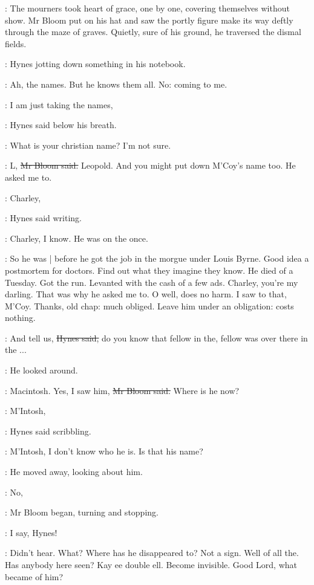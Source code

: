 :
The mourners took heart of grace,
one by one, covering themselves without show.
Mr Bloom put on his hat
and saw the portly figure make its way deftly through the maze of graves.
Quietly, sure of his ground,
he traversed the dismal fields.

\BloomInt:
Hynes jotting down something in his notebook.

\BloomInt:
Ah, the names.
But he knows them all.
No:
coming to me.

\hynes:
I am just taking the names,

:
Hynes said below his breath.

\hynes:
What is your christian name?
I'm not sure.

\Bloom:
L,
\sout{Mr Bloom said.}
Leopold.
And you might put down M'Coy's name too.
He asked me to.

\hynes:
Charley,

:
Hynes said writing.

\hynes:
Charley,
I know.
He was on the  once.

\BloomInt:
So he was |
before he got the job in the morgue under Louis Byrne.
Good idea a postmortem for doctors.
Find out what they imagine they know.
He died of a Tuesday.
Got the run.
Levanted with the cash of a few ads.
Charley, you're my darling.
That was why he asked me to.
O well, does no harm.
I saw to that, M'Coy.
Thanks, old chap:
much obliged.
Leave him under an obligation:
costs nothing.

\hynes:
And tell us,
\sout{Hynes said,}
do you know that fellow in the,
fellow was over there in the ...

:
He looked around.

\Bloom:
Macintosh.
Yes, I saw him,
\sout{Mr Bloom said.}
Where is he now?

\hynes:
M'Intosh,

:
Hynes said scribbling.

\hynes:
M'Intosh,
I don't know who he is.
Is that his name?

:
He moved away, looking about him.

\Bloom:
No,

:
Mr Bloom began, turning and stopping.

\Bloom:
I say, Hynes!

\BloomInt:
Didn't hear.
What?
Where has he disappeared to?
Not a sign.
Well of all the.
Has anybody here seen?
Kay ee double ell.
Become invisible.
Good Lord, what became of him?

